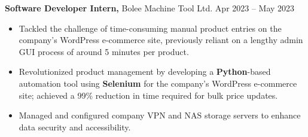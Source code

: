 \textbf{Software Developer Intern,} {Bolee Machine Tool Ltd.}  \hfill Apr 2023 -- May 2023 \\
\vspace{-9pt}
\begin{itemize}
  \item Tackled the challenge of time-consuming manual product entries on the company’s WordPress e-commerce site, previously reliant on a lengthy admin GUI process of around 5 minutes per product.
  \item Revolutionized product management by developing a \textbf{Python}-based automation tool using \textbf{Selenium} for the company’s WordPress e-commerce site; achieved a 99\% reduction in time required for bulk price updates.
  \item Managed and configured company VPN and NAS storage servers to enhance data security and accessibility.
\end{itemize}